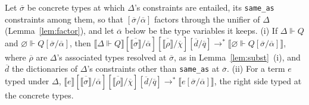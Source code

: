 \begin{lemma}
\label{lem:subst-dict}
Let $\overline{\sigma}$ be concrete types at which $\Delta$'s constraints are entailed, its \texttt{same\_as} constraints among them, so that $[\overline{\sigma}/\overline{\alpha}]$ factors through the unifier of $\Delta$ (Lemma~\ref{lem:factor}), and let $\overline{\alpha}$ below be the type variables it keeps.
(i) If $\Delta \Vdash Q$ and $\varnothing \Vdash Q[\overline{\sigma}/\overline{\alpha}]$, then $\llbracket \Delta \Vdash Q \rrbracket[\overline{\llbracket \sigma \rrbracket}/\overline{\alpha}][\overline{\llbracket \rho \rrbracket}/\overline{\chi}][\overline{d}/\overline{q}] \longrightarrow^{*} \llbracket \varnothing \Vdash Q[\overline{\sigma}/\overline{\alpha}] \rrbracket$, where $\overline{\rho}$ are $\Delta$'s associated types resolved at $\overline{\sigma}$, as in Lemma~\ref{lem:subst}~(i), and $\overline{d}$ the dictionaries of $\Delta$'s constraints other than \texttt{same\_as} at $\overline{\sigma}$.
(ii) For a term $e$ typed under $\Delta$, $\llbracket e \rrbracket[\overline{\llbracket \sigma \rrbracket}/\overline{\alpha}][\overline{\llbracket \rho \rrbracket}/\overline{\chi}][\overline{d}/\overline{q}] \longrightarrow^{*} \llbracket e[\overline{\sigma}/\overline{\alpha}] \rrbracket$, the right side typed at the concrete types.
\end{lemma}

